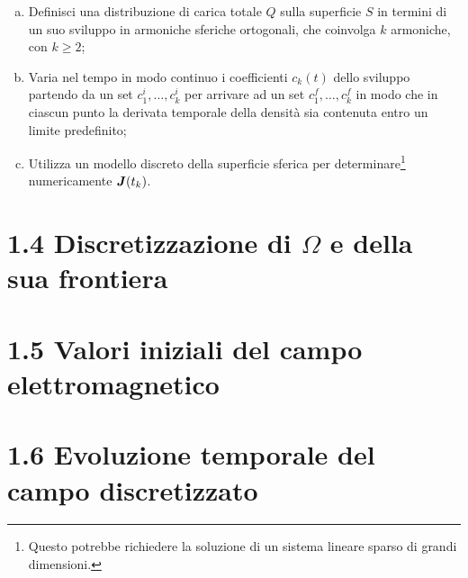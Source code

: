\begin{enumerate}[(I)]
\begin{enumerate}[(a)]
	\item Definisci una distribuzione di carica totale $Q$ sulla superficie $S$ in termini di un  suo sviluppo in armoniche sferiche ortogonali, che coinvolga $k$ armoniche, con $k \geq 2$;  
	\item Varia nel tempo in modo continuo i coefficienti $c_k(t)$ dello sviluppo partendo da un set  $c^{i}_1, \ldots, c^{i}_k$ per arrivare ad un set  $c^{f}_1, \ldots, c^{f}_k$ in modo che in ciascun punto la derivata temporale della densità sia contenuta entro un limite predefinito;
	\item Utilizza un modello discreto della superficie sferica per determinare\footnote{Questo potrebbe richiedere la soluzione di un sistema lineare sparso di grandi dimensioni.} numericamente $\vb*{J}(t_k)$.
	\end{enumerate}
\end{enumerate}

\section*{1.4 Discretizzazione di $\Omega$ e della sua frontiera}\label{sec_1.4}


\section*{1.5 Valori iniziali del campo elettromagnetico}\label{sec_1.5}


\section*{1.6 Evoluzione temporale del campo discretizzato}\label{sec_1.6}

